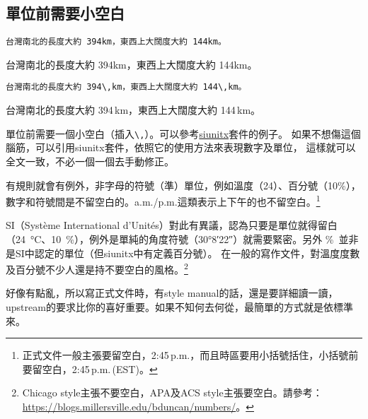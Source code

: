\subsection{單位前需要小空白}
\label{sub:unit}

\begin{Wrong}
\begin{verbatim}
台灣南北的長度大約 394km，東西上大闊度大約 144km。
\end{verbatim}

台灣南北的長度大約 394km，東西上大闊度大約 144km。
\end{Wrong}

\begin{Right}
\begin{verbatim}
台灣南北的長度大約 394\,km，東西上大闊度大約 144\,km。
\end{verbatim}

台灣南北的長度大約 394\,km，東西上大闊度大約 144\,km。
\end{Right}

單位前需要一個小空白（插入\verb|\,|）。可以參考\href{https://github.com/josephwright/siunitx}{\sf siunitx}套件的例子。
如果不想傷這個腦筋，可以引用{\sf siunitx}套件，依照它的使用方法來表現數字及單位，
這樣就可以全文一致，不必一個一個去手動修正。

有規則就會有例外，非字母的符號（準）單位，例如溫度（24\textcelsius）、百分號（10\%），數字和符號間是不留空白的。a.m./p.m.\/這類表示上下午的也不留空白。\footnote{正式文件一般主張要留空白，2:45\,p.m.，而且時區要用小括號括住，小括號前要留空白，2:45\,p.m.\,(EST)。}

{\sf SI}（Système International d'Unités）對此有異議，認為只要是單位就得留白（\SI{24}{\degreeCelsius}、\SI{10}{\percent}），例外是單純的角度符號（\ang{30;8;22}）就需要緊密。另外 \%\ 並非是{\sf SI}中認定的單位（但{\sf siunitx}中有定義百分號）。
在一般的寫作文件，對溫度度數及百分號不少人還是持不要空白的風格。\footnote{Chicago style主張不要空白，APA及ACS style主張要空白。請參考：\url{https://blogs.millersville.edu/bduncan/numbers/}。}

好像有點亂，所以寫正式文件時，有style manual的話，還是要詳細讀一讀，upstream的要求比你的喜好重要。如果不知何去何從，最簡單的方式就是依標準來。

\marginpar{\back}

